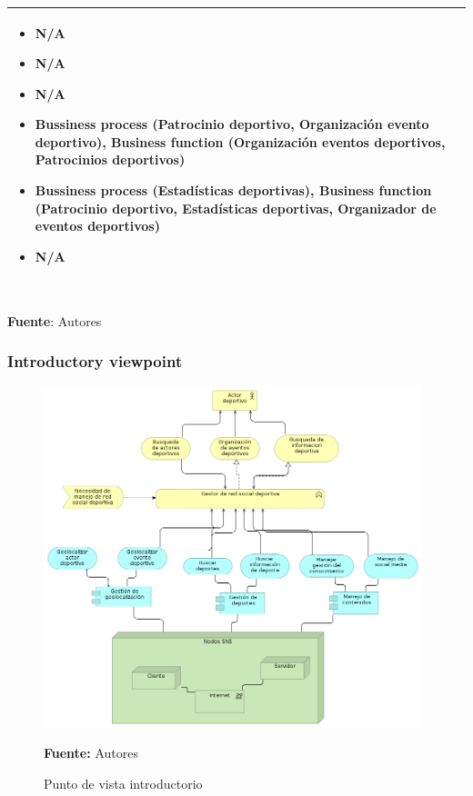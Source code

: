 \begin{table}[!htb]
\begin{center}
{\begin{tabular}{|p{7cm}|p{4cm}|}
\begin{itemize}
				\item N/A
				\item N/A
				\item N/A
				\item Bussiness process (Patrocinio deportivo, Organización evento deportivo), Business function (Organización eventos deportivos, Patrocinios deportivos)
				\item Bussiness process (Estadísticas deportivas), Business function (Patrocinio deportivo, Estadísticas deportivas, Organizador de eventos deportivos)
				\item N/A
			\end{itemize} 
			\\
			\hline
		\end{tabular}
		} \\
		\textbf{Fuente}: Autores
	\end{center}
\end{table}

\subsubsection{Introductory viewpoint}

\begin{figure}[!htb]
  \begin{center}
    \includegraphics[width=11cm]{./imagenes/introductory.png}
    \caption{Punto de vista introductorio}
    \label{fig:introductory}
    \textbf{Fuente:}  Autores
  \end{center}
\end{figure}

